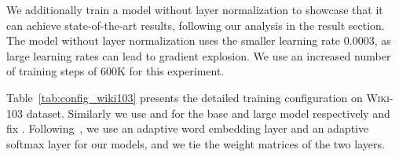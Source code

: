 \documentclass[11pt,a4paper]{article}
\begin{document}
We additionally train a model without layer normalization to showcase that it can achieve state-of-the-art results, following our analysis in the result section.
The model without layer normalization uses the smaller learning rate 0.0003, as large learning rates can lead to gradient explosion.
We use an increased number of training steps of 600K for this experiment.

Table~\ref{tab:config_wiki103} presents the detailed training configuration on \textsc{Wiki-103} dataset.
Similarly we use  and  for the base and large model respectively and fix .
Following~\cite{baevski2018adaptive}, we use an adaptive word embedding layer and an adaptive softmax layer for our models, and we tie the weight matrices of the two layers.
 
\end{document}
